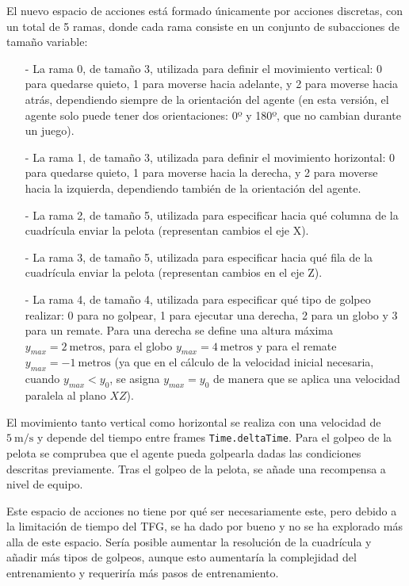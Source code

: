 El nuevo espacio de acciones está formado únicamente por acciones discretas, con un total de 5 ramas, donde cada rama consiste en un conjunto de subacciones de tamaño variable:
\begin{enumerate}
    \item[-] La rama 0, de tamaño 3, utilizada para definir el movimiento vertical: 0 para quedarse quieto, 1 para moverse hacia adelante, y 2 para moverse hacia atrás, dependiendo siempre de la orientación del agente (en esta versión, el agente solo puede tener dos orientaciones: 0º y 180º, que no cambian durante un juego).
    \item[-] La rama 1, de tamaño 3, utilizada para definir el movimiento horizontal: 0 para quedarse quieto, 1 para moverse hacia la derecha, y 2 para moverse hacia la izquierda, dependiendo también de la orientación del agente.
    \item[-] La rama 2, de tamaño 5, utilizada para especificar hacia qué columna de la cuadrícula enviar la pelota (representan cambios el eje X).
    \item[-] La rama 3, de tamaño 5, utilizada para especificar hacia qué fila de la cuadrícula enviar la pelota (representan cambios en el eje Z).
    \item[-] La rama 4, de tamaño 4, utilizada para especificar qué tipo de golpeo realizar: 0 para no golpear, 1 para ejecutar una derecha, 2 para un globo y 3 para un remate. Para una derecha se define una altura máxima $y_{max} = 2~\text{metros}$, para el globo $y_{max} = 4~ \text{metros}$ y para el remate $y_{max} = -1~\text{metros}$ (ya que en el cálculo de la velocidad inicial necesaria, cuando $y_{max} < y_0$, se asigna $y_{max} = y_0$ de manera que se aplica una velocidad paralela al plano $XZ$).
\end{enumerate}

El movimiento tanto vertical como horizontal se realiza con una velocidad de $5~\text{m/s}$ y depende del tiempo entre frames \texttt{Time.deltaTime}. Para el golpeo de la pelota se comprubea que el agente pueda golpearla dadas las condiciones descritas previamente. Tras el golpeo de la pelota, se añade una recompensa a nivel de equipo.

Este espacio de acciones no tiene por qué ser necesariamente este, pero debido a la limitación de tiempo del TFG, se ha dado por bueno y no se ha explorado más alla de este espacio. Sería posible aumentar la resolución de la cuadrícula y añadir más tipos de golpeos, aunque esto aumentaría la complejidad del entrenamiento y requeriría más pasos de entrenamiento.


